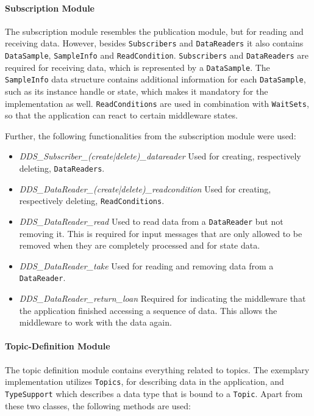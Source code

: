 \paragraph{Subscription Module}
The subscription module resembles the publication module, but for reading and receiving data.
However, besides \texttt{Subscribers} and \texttt{DataReaders} it also contains \texttt{DataSample}, \texttt{SampleInfo} and \texttt{ReadCondition}.
\texttt{Subscribers} and \texttt{DataReaders} are required for receiving data, which is represented by a \texttt{DataSample}.
The \texttt{SampleInfo} data structure contains additional information for each \texttt{DataSample}, such as its instance handle or state, which makes it mandatory for the implementation as well.
\texttt{ReadConditions} are used in combination with \texttt{WaitSets}, so that the application can react to certain middleware states.

Further, the following functionalities from the subscription module were used:

\begin{itemize}
\item \textit{DDS\_Subscriber\_(create|delete)\_datareader} Used for creating, respectively deleting, \texttt{DataReaders}.
\item \textit{DDS\_DataReader\_(create|delete)\_readcondition} Used for creating, respectively deleting, \texttt{ReadConditions}.
\item \textit{DDS\_DataReader\_read} Used to read data from a \texttt{DataReader} but not removing it. This is required for input messages that are only allowed to be removed when they are completely processed and for state data.
\item \textit{DDS\_DataReader\_take} Used for reading and removing data from a \texttt{DataReader}.
\item \textit{DDS\_DataReader\_return\_loan} Required for indicating the middleware that the application finished accessing a sequence of data. This allows the middleware to work with the data again.
\end{itemize}

\paragraph{Topic-Definition Module}
The topic definition module contains everything related to topics.
The exemplary implementation utilizes \texttt{Topics}, for describing data in the application, and \texttt{TypeSupport} which describes a data type that is bound to a \texttt{Topic}.
Apart from these two classes, the following methods are used:


